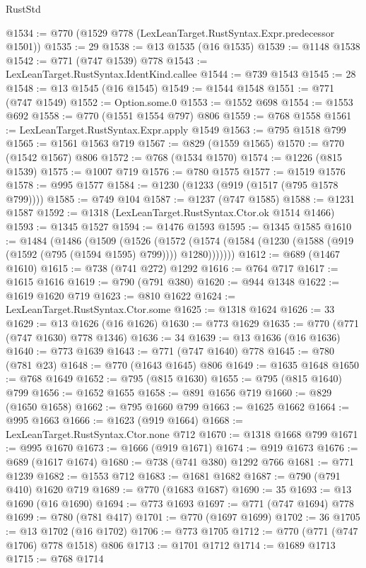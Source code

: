 \begin{lexlean}{RustStd}
\begin{coremodule}
{\begin{coremodule}
{{{{{{{{{{{{{{{@1534 := @770 (@1529 @778 (LexLeanTarget.RustSyntax.Expr.predecessor @1501))
@1535 := 29
@1538 := @13 @1535 (@16 @1535)
@1539 := @1148 @1538
@1542 := @771 (@747 @1539) @778
@1543 := LexLeanTarget.RustSyntax.IdentKind.callee
@1544 := @739 @1543
@1545 := 28
@1548 := @13 @1545 (@16 @1545)
@1549 := @1544 @1548
@1551 := @771 (@747 @1549)
@1552 := Option.some.{0}
@1553 := @1552 @698
@1554 := @1553 @692
@1558 := @770 (@1551 @1554 @797) @806
@1559 := @768 @1558
@1561 := LexLeanTarget.RustSyntax.Expr.apply @1549
@1563 := @795 @1518 @799
@1565 := @1561 @1563 @719
@1567 := @829 (@1559 @1565)
@1570 := @770 (@1542 @1567) @806
@1572 := @768 (@1534 @1570)
@1574 := @1226 (@815 @1539)
@1575 := @1007 @719
@1576 := @780 @1575
@1577 := @1519 @1576
@1578 := @995 @1577
@1584 := @1230 (@1233 (@919 (@1517 (@795 @1578 @799))))
@1585 := @749 @104
@1587 := @1237 (@747 @1585)
@1588 := @1231 @1587
@1592 := @1318 (LexLeanTarget.RustSyntax.Ctor.ok @1514 @1466)
@1593 := @1345 @1527
@1594 := @1476 @1593
@1595 := @1345 @1585
@1610 := @1484
    (@1486
      (@1509
        (@1526
          (@1572 (@1574 (@1584 (@1230 (@1588 (@919 (@1592 (@795 (@1594 @1595) @799)))) @1280)))))))
@1612 := @689 (@1467 @1610)
@1615 := @738 (@741 @272) @1292
@1616 := @764 @717
@1617 := @1615 @1616
@1619 := @790 (@791 @380)
@1620 := @944 @1348
@1622 := @1619 @1620 @719
@1623 := @810 @1622
@1624 := LexLeanTarget.RustSyntax.Ctor.some
@1625 := @1318 @1624
@1626 := 33
@1629 := @13 @1626 (@16 @1626)
@1630 := @773 @1629
@1635 := @770 (@771 (@747 @1630) @778 @1346)
@1636 := 34
@1639 := @13 @1636 (@16 @1636)
@1640 := @773 @1639
@1643 := @771 (@747 @1640) @778
@1645 := @780 (@781 @23)
@1648 := @770 (@1643 @1645) @806
@1649 := @1635 @1648
@1650 := @768 @1649
@1652 := @795 (@815 @1630)
@1655 := @795 (@815 @1640) @799
@1656 := @1652 @1655
@1658 := @891 @1656 @719
@1660 := @829 (@1650 @1658)
@1662 := @795 @1660 @799
@1663 := @1625 @1662
@1664 := @995 @1663
@1666 := @1623 (@919 @1664)
@1668 := LexLeanTarget.RustSyntax.Ctor.none @712
@1670 := @1318 @1668 @799
@1671 := @995 @1670
@1673 := @1666 (@919 @1671)
@1674 := @919 @1673
@1676 := @689 (@1617 @1674)
@1680 := @738 (@741 @380) @1292 @766
@1681 := @771 @1239
@1682 := @1553 @712
@1683 := @1681 @1682
@1687 := @790 (@791 @410) @1620 @719
@1689 := @770 (@1683 @1687)
@1690 := 35
@1693 := @13 @1690 (@16 @1690)
@1694 := @773 @1693
@1697 := @771 (@747 @1694) @778
@1699 := @780 (@781 @417)
@1701 := @770 (@1697 @1699)
@1702 := 36
@1705 := @13 @1702 (@16 @1702)
@1706 := @773 @1705
@1712 := @770 (@771 (@747 @1706) @778 @1518) @806
@1713 := @1701 @1712
@1714 := @1689 @1713
@1715 := @768 @1714
}}}}}}}}}}}}}}}
\end{coremodule}}
\end{coremodule}
\end{lexlean}
